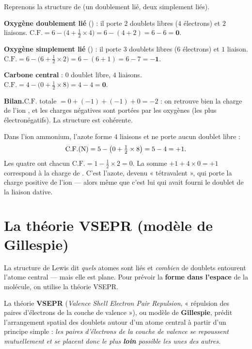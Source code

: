\documentclass[11pt,a4paper]{article}
\newcommand{\CF}{\ensuremath{\mathrm{C.F.}}}
\begin{document}
\begin{exemple}
Reprenons la structure de  (un  doublement lié, deux  simplement liés).

\smallskip
\textbf{Oxygène doublement lié} () : il porte $2$ doublets libres ($4$ électrons) et $2$
liaisons. \;
$\CF = 6 - \big(4 + \tfrac12\times 4\big) = 6 - (4+2) = 6 - 6 = \mathbf{0}.$

\smallskip
\textbf{Oxygène simplement lié} () : il porte $3$ doublets libres ($6$ électrons) et $1$
liaison. \;
$\CF = 6 - \big(6 + \tfrac12\times 2\big) = 6 - (6+1) = 6 - 7 = \mathbf{-1}.$

\smallskip
\textbf{Carbone central} : $0$ doublet libre, $4$ liaisons. \;
$\CF = 4 - \big(0 + \tfrac12\times 8\big) = 4 - 4 = \mathbf{0}.$

\smallskip
\textbf{Bilan.}\quad $\CF$ totale $= 0 + (-1) + (-1) + 0 = -2$ : on retrouve bien la charge de
l'ion , et les charges négatives sont portées par les oxygènes (les plus
électronégatifs). La structure est cohérente.
\end{exemple}

\begin{exemple}
Dans l'ion ammonium, l'azote forme $4$ liaisons et ne porte aucun doublet libre :
\[ \CF(\ce{N}) = 5 - \big(0 + \tfrac12\times 8\big) = 5 - 4 = +1. \]
Les quatre  ont chacun $\CF = 1 - \tfrac12\times 2 = 0$. La somme $+1 + 4\times 0 = +1$
correspond à la charge de . C'est l'azote, devenu « tétravalent », qui porte la charge
positive de l'ion — alors même que c'est lui qui avait fourni le doublet de la liaison dative.
\end{exemple}

\section{La théorie VSEPR (modèle de Gillespie)}
\label{sec:vsepr}

La structure de Lewis dit \emph{quels} atomes sont liés et \emph{combien} de doublets entourent
l'atome central — mais elle est plane. Pour prévoir la \textbf{forme dans l'espace} de la
molécule, on utilise la théorie VSEPR.

\begin{definition}
La théorie \textbf{VSEPR} (\emph{Valence Shell Electron Pair Repulsion}, « répulsion des paires
d'électrons de la couche de valence »), ou modèle de \textbf{Gillespie}, prédit l'arrangement
spatial des doublets autour d'un atome central à partir d'un principe simple : \emph{les paires
d'électrons de la couche de valence se repoussent mutuellement et se placent donc le plus
\textbf{loin} possible les unes des autres}.
\end{definition}
\end{document}
